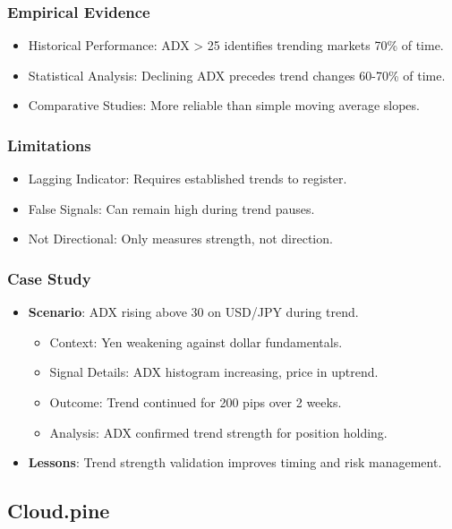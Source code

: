\documentclass[12pt]{article}
\begin{document}
\subsubsection{Empirical Evidence}
\begin{itemize}
\item Historical Performance: ADX > 25 identifies trending markets 70\% of time.
\item Statistical Analysis: Declining ADX precedes trend changes 60-70\% of time.
\item Comparative Studies: More reliable than simple moving average slopes.
\end{itemize}

\subsubsection{Limitations}
\begin{itemize}
\item Lagging Indicator: Requires established trends to register.
\item False Signals: Can remain high during trend pauses.
\item Not Directional: Only measures strength, not direction.
\end{itemize}

\subsubsection{Case Study}
\begin{itemize}
\item \textbf{Scenario}: ADX rising above 30 on USD/JPY during trend.
  \begin{itemize}
  \item Context: Yen weakening against dollar fundamentals.
  \item Signal Details: ADX histogram increasing, price in uptrend.
  \item Outcome: Trend continued for 200 pips over 2 weeks.
  \item Analysis: ADX confirmed trend strength for position holding.
  \end{itemize}
\item \textbf{Lessons}: Trend strength validation improves timing and risk management.
\end{itemize}

\subsection{Cloud.pine}
\label{subsec:cloud}
\end{document}
